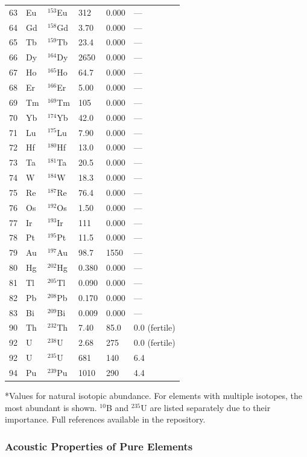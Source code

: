 \documentclass[12pt,a4paper]{article}
\begin{document}
\begin{longtable}{p{0.8cm}p{1.2cm}p{2.0cm}p{2.5cm}p{2.5cm}p{2.5cm}}
		63 & Eu & \(^{153}\)Eu & 312 & 0.000 & --- \\
		64 & Gd & \(^{158}\)Gd & 3.70 & 0.000 & --- \\
		65 & Tb & \(^{159}\)Tb & 23.4 & 0.000 & --- \\
		66 & Dy & \(^{164}\)Dy & 2650 & 0.000 & --- \\
		67 & Ho & \(^{165}\)Ho & 64.7 & 0.000 & --- \\
		68 & Er & \(^{166}\)Er & 5.00 & 0.000 & --- \\
		69 & Tm & \(^{169}\)Tm & 105 & 0.000 & --- \\
		70 & Yb & \(^{174}\)Yb & 42.0 & 0.000 & --- \\
		71 & Lu & \(^{175}\)Lu & 7.90 & 0.000 & --- \\
		72 & Hf & \(^{180}\)Hf & 13.0 & 0.000 & --- \\
		73 & Ta & \(^{181}\)Ta & 20.5 & 0.000 & --- \\
		74 & W  & \(^{184}\)W & 18.3 & 0.000 & --- \\
		75 & Re & \(^{187}\)Re & 76.4 & 0.000 & --- \\
		76 & Os & \(^{192}\)Os & 1.50 & 0.000 & --- \\
		77 & Ir & \(^{193}\)Ir & 111 & 0.000 & --- \\
		78 & Pt & \(^{195}\)Pt & 11.5 & 0.000 & --- \\
		79 & Au & \(^{197}\)Au & 98.7 & 1550 & --- \\
		80 & Hg & \(^{202}\)Hg & 0.380 & 0.000 & --- \\
		81 & Tl & \(^{205}\)Tl & 0.090 & 0.000 & --- \\
		82 & Pb & \(^{208}\)Pb & 0.170 & 0.000 & --- \\
		83 & Bi & \(^{209}\)Bi & 0.009 & 0.000 & --- \\
		90 & Th & \(^{232}\)Th & 7.40 & 85.0 & 0.0 (fertile) \\
		92 & U  & \(^{238}\)U & 2.68 & 275 & 0.0 (fertile) \\
		92 & U  & \(^{235}\)U & 681 & 140 & 6.4 \\
		94 & Pu & \(^{239}\)Pu & 1010 & 290 & 4.4 \\
		\bottomrule
	\end{longtable}
	*Values for natural isotopic abundance. For elements with multiple isotopes, the most abundant is shown. \(^{10}\)B and \(^{235}\)U are listed separately due to their importance. Full references available in the repository.
	
	\subsubsection{Acoustic Properties of Pure Elements}
	\label{subsec:acoustic-properties-func}
	
\end{document}
